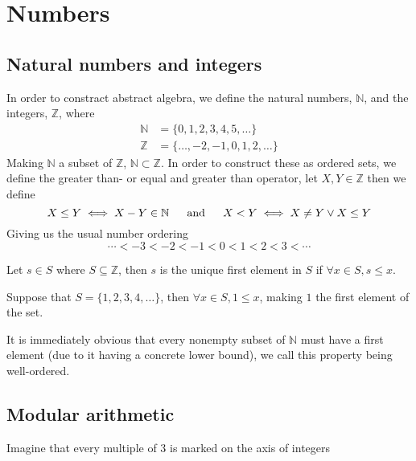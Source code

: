 \section{Numbers}
\subsection{Natural numbers and integers}
In order to constract abstract algebra, we define the natural numbers, $\mathbb{N}$, and the integers, $\mathbb{Z}$, where
\begin{align*}
    \mathbb{N}&=\{0,1,2,3,4,5,\ldots\} \\
    \mathbb{Z}&=\{\ldots,-2,-1,0,1,2,\ldots\}
\end{align*}
Making $\mathbb{N}$ a subset of $\mathbb{Z}$, $\mathbb{N}\subset\mathbb{Z}$. In order to construct these as ordered sets, we define the greater than- or equal and  greater than operator, let $X,Y\in\mathbb{Z}$ then we define
\[
    X\leq Y\iff X-Y\in\mathbb{N}\hskip 16pt \text{and}\hskip 16pt X<Y\iff X\neq Y\vee X\leq Y
\]
Giving us the usual number ordering
\[
    \cdots<-3<-2<-1<0<1<2<3<\cdots
\]\vskip -10pt
\begin{defi}
    Let $s\in S$ where $S\subseteq\mathbb{Z}$, then $s$ is the unique first element in $S$ if $\forall x\in S,s\leq x$.
\end{defi}
\begin{exmp}
    Suppose that $S=\{1,2,3,4,\ldots\}$, then $\forall x\in S,1\leq x$, making $1$ the first element of the set.
\end{exmp}
It is immediately obvious that every nonempty subset of $\mathbb{N}$ must have a first element (due to it having a concrete lower bound), we call this property being well-ordered.
\pagebreak\subsection{Modular arithmetic}
Imagine that every multiple of 3 is marked on the axis of integers
\begin{figure}[!h]
    \centering
\end{figure}

